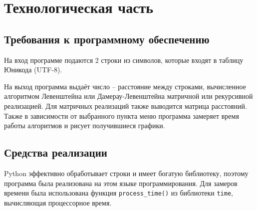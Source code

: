 \section{Технологическая часть}
\subsection{Требования к программному обеспечению}
На вход программе подаются 2 строки из символов, которые входят в таблицу Юникода (UTF-8).\par
На выход программа выдаёт число – расстояние между строками, вычисленное алгоритмом Левенштейна или Дамерау-Левенштейна матричной или рекурсивной реализацией. Для матричных реализаций также выводится матрица расстояний. Также в зависимости от выбранного пункта меню программа замеряет время работы алгоритмов и рисует получившиеся графики.
\subsection{Средства реализации}
Python эффективно обработывает строки и имеет богатую библиотеку, поэтому программа была реализована на этом языке программирования. Для замеров времени была использована функция \texttt{process\_time()} из библиотеки \texttt{time}, вычисляющая процессорное время\cite{process_time}.
